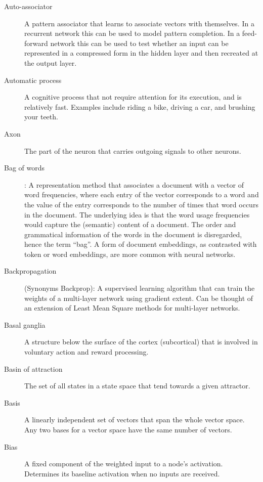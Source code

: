 \begin{description}
\item[Auto-associator] A pattern associator that learns to associate vectors with themselves. In a recurrent network this can be used to model pattern completion. In a feed-forward network this can be used to test whether an input can be represented in a compressed form in the hidden layer and then recreated at the output layer. 

\item[Automatic process] A cognitive process that not require attention for its execution, and is relatively fast. Examples include riding a bike, driving a car, and brushing your teeth.

\item[Axon] The part of the neuron that carries outgoing signals to other neurons.

\item[Bag of words]: A representation method that associates a document with a vector of word frequencies, where each entry of the vector corresponds to a word and the value of the entry corresponds to the number of times that word occurs in the document. The underlying idea is that the word usage frequencies would capture the (semantic) content of a document. The order and grammatical information of the words in the document is disregarded, hence the term ``bag''.  A form of document embeddings, as contrasted with token or word embeddings, are more common with neural networks.

\item[Backpropagation] (Synonyms Backprop): A supervised learning algorithm that can train the weights of a multi-layer network using gradient extent. Can be thought of an extension of Least Mean Square methods for multi-layer networks. 

\item[Basal ganglia] A structure below the surface of the cortex (subcortical) that is involved in voluntary action and reward processing.

\item[Basin of attraction] The set of all states in a state space that tend 
towards a given attractor.

\item[Basis] A linearly independent set of vectors that span the whole vector space. Any two bases for a vector space have the same number of vectors.

\item[Bias] A fixed component of the weighted input to a node's activation. Determines its baseline activation when no inputs are received.


\end{description}
